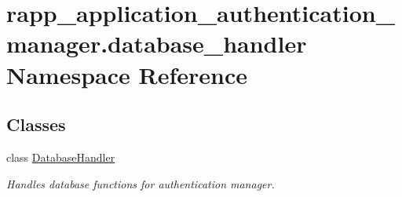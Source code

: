 \hypertarget{namespacerapp__application__authentication__manager_1_1database__handler}{\section{rapp\-\_\-application\-\_\-authentication\-\_\-manager.\-database\-\_\-handler Namespace Reference}
\label{namespacerapp__application__authentication__manager_1_1database__handler}
}
\subsection*{Classes}
\begin{DoxyCompactItemize}
\item 
class \hyperlink{classrapp__application__authentication__manager_1_1database__handler_1_1DatabaseHandler}{Database\-Handler}
\begin{DoxyCompactList}\small\item\em Handles database functions for authentication manager. \end{DoxyCompactList}\end{DoxyCompactItemize}
